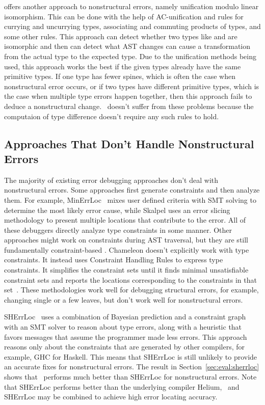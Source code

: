 \documentclass[12pt]{report}	%
\begin{document}
\cite{McAdam02:RTE} offers another approach to nonstructural errors, namely
unification modulo linear isomorphism.
This can be done with the help of AC-unification and rules for
currying and uncurrying types, associating and
commuting products of types, and some other rules.
This approach can detect whether two types like
 and  are isomorphic and then can detect what AST changes
can cause a transformation from the actual type to the expected type.
Due to the unification methods being used, this
approach works the best if the given types already have the same
primitive types. If one type has fewer spines, which is often the
case when nonstructural error occurs, or if two types have different
primitive types, which is the case when multiple type errors happen
together, then this approach fails to deduce a nonstructural change.
%
\newCompiler\ doesn't suffer from these problems because the computaion
of type difference doesn't require any such rules to hold.

\subsection{Approaches That Don't Handle Nonstructural Errors}

The majority of existing error debugging approaches don't
deal with nonstructural errors. Some approaches first generate
constraints and then analyze them. For example, MinErrLoc~\cite{Pavlinovic14:FMT,Pavlinovic15:PST} mixes
user defined criteria with SMT solving to determine the most likely error cause, while
Skalpel \cite{Haack03:TES}
uses an error slicing methodology to present multiple locations that contribute to
the error. All of these debuggers directly analyze type constraints in some manner.
%
Other approaches
might work on constraints during AST traversal, but they are still fundamentally constraint-based
\cite{Lee98:PAF,Lee00:GLP,McAdam02:RTE,Yang00:ETE,Wand86:FST,Duggan95:ETI,Chitil01:CET}.
Chameleon doesn't explicitly work with type constraints. It instead uses
Constraint Handling Rules to express type constraints. It simplifies
the constraint sets until it finds
minimal unsatisfiable constraint sets and reports the locations corresponding to the
constraints in that set~\cite{Stuckey03:ITD,Stuckey04:ITE,Wazny06:TIT}.
These methodologies work well for debugging structural errors, for example, changing
single or a few leaves, but don't work well for nonstructural errors.


SHErrLoc~\cite{Zhang15:DTE}  uses a combination of Bayesian prediction and
a constraint graph with an SMT solver to reason about type errors,
along with a heuristic
that favors messages that assume the programmer made less errors.
%
This approach reasons only about the constraints that are generated by
other compilers, for example, GHC for Haskell.
This means that SHErrLoc is still unlikely
to provide an accurate fixes for nonstructural errors.
The result in Section~\ref{sec:eval:sherrloc} shows that \newCompiler\
performs much better than SHErrLoc for nonstructural errors.
Note that SHErrLoc performs better than the underlying compiler Helium,
\newCompiler\ and SHErrLoc may be combined 
to achieve high error locating accuracy.
\end{document}
